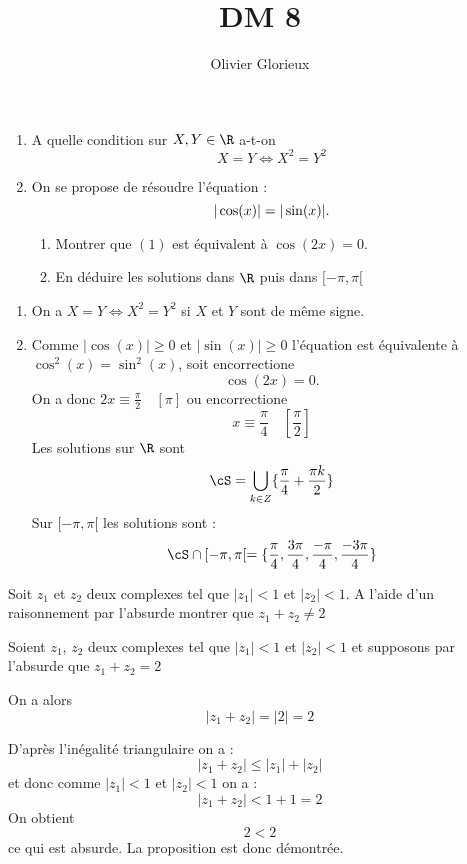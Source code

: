 \documentclass[a4paper, 11pt,reqno]{article}
\author{Olivier Glorieux}
\begin{document}
\title{DM 8
 }

 
\vspace{0.7cm}
\begin{exercice}
\begin{enumerate}
\item A quelle condition sur $X,Y\in \R$ a-t-on 
$$X=Y \Longleftrightarrow X^2=Y^2  $$

\item On se propose de résoudre l'équation :
\begin{equation}
|\cos(x)|=|\sin(x)|.\\
\end{equation}
\begin{enumerate}
\item Montrer que $(1)$ est équivalent à $\cos(2x)=0$. 
\item En déduire les solutions  dans $\R$ puis dans $[-\pi, \pi[$ 
\end{enumerate}

\end{enumerate}
\end{exercice}


\begin{correction}
\begin{enumerate}
\item On a  $X=Y \Longleftrightarrow X^2=Y^2  $ si $X$ et $Y$ sont de même signe.
\item Comme $|\cos(x)|\geq 0$ et $|\sin(x)|\geq 0$ l'équation est équivalente à $\cos^2(x) =\sin^2(x)$, soit encorrectione 
$$\cos(2x)=0.$$
On a donc $2x\equiv \frac{\pi}{2}\quad [\pi]$ ou encorrectione 
$$x\equiv \frac{\pi}{4}\quad [\frac{\pi}{2}]$$
 Les solutions sur $\R$ sont 
 $$\cS =\bigcup_{k\in Z} \{ \frac{\pi}{4}+\frac{\pi k}{2}\}$$
 Sur $[-\pi, \pi[$  les solutions sont :
 $$\cS\cap [-\pi, \pi[ =  \{ \frac{\pi}{4}, \frac{3\pi}{4}, \frac{-\pi}{4}, \frac{-3\pi}{4}\}$$
 




\end{enumerate}
\end{correction}


\begin{exercice}
Soit $z_1 $ et $z_2$ deux complexes tel que $|z_1|<1 $ et $|z_2|<1$. A l'aide d'un raisonnement par l'absurde montrer que $z_1+z_2\neq 2$
\end{exercice}

\begin{correction}
Soient $z_1$, $z_2$ deux complexes tel que  $|z_1|<1 $ et $|z_2|<1$ et supposons par l'absurde que $z_1+z_2=2$

On a alors 
$$|z_1+z_2|=|2|=2$$

D'après l'inégalité triangulaire on a :
$$|z_1+z_2|\leq |z_1|+|z_2|$$
et donc comme  $|z_1|<1 $ et $|z_2|<1$ on a  :
$$|z_1+z_2|<1+1=2$$
On obtient 
$$2<2$$ ce qui est absurde. 
La proposition est donc démontrée. 




\end{correction}
\end{document}
